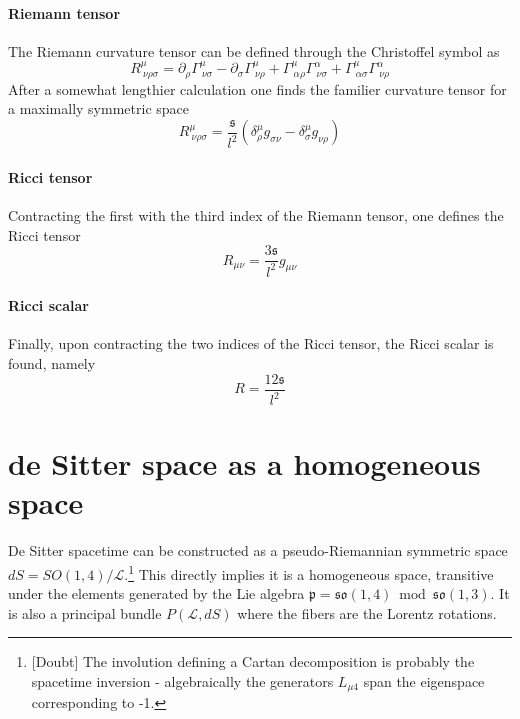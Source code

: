 \documentclass[10pt]{article}
\newcommand{\mcal}{\mathcal}
\newcommand{\mfrak}{\mathfrak}
\newcommand{\pd}{\partial}
\newcommand{\spc}{\ }
\newcommand{\blu}{\color{blue}}
\begin{document}
\paragraph{Riemann tensor}
The Riemann curvature tensor can be defined through the 
Christoffel symbol as
\begin{displaymath}
	R^\mu_{\spc\nu\rho\sigma} = \pd_\rho 
	\Gamma^{\mu}_{\spc\nu\sigma} - \pd_\sigma 
	\Gamma^{\mu}_{\spc\nu\rho} + \Gamma^{\mu}_{\spc\alpha\rho} 
	\Gamma^{\alpha}_{\spc\nu\sigma} + 
	\Gamma^{\mu}_{\spc\alpha\sigma} \Gamma^{\alpha}_{\spc\nu\rho}
\end{displaymath}
After a somewhat lengthier calculation one finds the familier 
curvature tensor for a maximally symmetric space
\begin{equation}
	R^\mu_{\spc\nu\rho\sigma} = \frac{\mfrak{s}}{l^2} \left( 
		\delta_\rho^\mu g_{\sigma\nu} - \delta_\sigma^\mu g_{\nu\rho} 
	\right)
\end{equation}

\paragraph{Ricci tensor}
Contracting the first with the third index of the Riemann tensor, 
one defines the Ricci tensor
\begin{equation}
	R_{\mu\nu} = \frac{3\mfrak{s}}{l^2}g_{\mu\nu}
\end{equation}

\paragraph{Ricci scalar}
Finally, upon contracting the two indices of the Ricci tensor, 
the Ricci scalar is found, namely
\begin{equation}
	R = \frac{12 \mfrak{s}}{l^2}
\end{equation}



\section{de Sitter space as a homogeneous space}

De Sitter spacetime can be constructed as a pseudo-Riemannian 
symmetric space $dS = SO(1,4)/\mcal{L}$.\footnote{[{\blu Doubt}] 
	The involution defining a Cartan decomposition is probably the 
	spacetime inversion - algebraically the generators $L_{\mu4}$ 
	span the eigenspace corresponding to -1.} This directly implies 
it is a homogeneous space, transitive under the elements 
generated by the Lie algebra 
$\mfrak{p}=\mfrak{so}(1,4)\bmod\mfrak{so}(1,3)$.  It is also a 
principal bundle $P(\mcal{L},dS)$ where the fibers are the 
Lorentz rotations.
\end{document}

